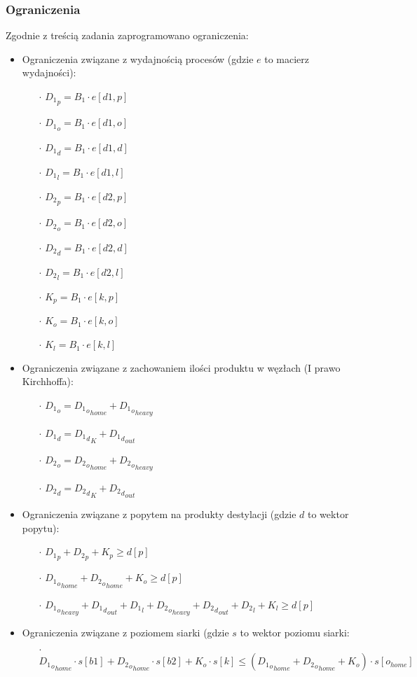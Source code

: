 \documentclass{article}
\begin{document}
\subsubsection{Ograniczenia}
Zgodnie z treścią zadania zaprogramowano ograniczenia:
\begin{itemize}
	\item Ograniczenia związane z wydajnością procesów (gdzie $e$ to macierz wydajności):
	\begin{itemize}
		\item[$\cdot$] ${D_1}_p = B_1 \cdot e[d1,p]$
		\item[$\cdot$] ${D_1}_o = B_1 \cdot e[d1,o]$
		\item[$\cdot$] ${D_1}_d = B_1 \cdot e[d1,d]$
		\item[$\cdot$] ${D_1}_l = B_1 \cdot e[d1,l]$
		\item[$\cdot$] ${D_2}_p = B_1 \cdot e[d2,p]$
		\item[$\cdot$] ${D_2}_o = B_1 \cdot e[d2,o]$
		\item[$\cdot$] ${D_2}_d = B_1 \cdot e[d2,d]$
		\item[$\cdot$] ${D_2}_l = B_1 \cdot e[d2,l]$
		\item[$\cdot$] ${K}_p = B_1 \cdot e[k,p]$
		\item[$\cdot$] ${K}_o = B_1 \cdot e[k,o]$
		\item[$\cdot$] ${K}_l = B_1 \cdot e[k,l]$
	\end{itemize}
	\item Ograniczenia związane z zachowaniem ilości produktu w węzłach (I prawo Kirchhoffa):
	\begin{itemize}
		\item[$\cdot$] ${D_1}_o = {{D_1}_o}_{home} + {{D_1}_o}_{heavy}$
		\item[$\cdot$] ${D_1}_d = {{D_1}_d}_K + {{D_1}_d}_{out}$
		\item[$\cdot$] ${D_2}_o = {{D_2}_o}_{home} + {{D_2}_o}_{heavy}$
		\item[$\cdot$] ${D_2}_d = {{D_2}_d}_K + {{D_2}_d}_{out}$
	\end{itemize}
	\item Ograniczenia związane z popytem na produkty destylacji (gdzie $d$ to wektor popytu):
	\begin{itemize}
		\item[$\cdot$] ${D_1}_p + {D_2}_p + K_p \geq d[p]$
		\item[$\cdot$] ${{D_1}_o}_{home} + {{D_2}_o}_{home} + K_o \geq d[p]$
		\item[$\cdot$] ${{D_1}_o}_{heavy} + {{D_1}_d}_{out} + {D_1}_l + {{D_2}_o}_{heavy} + {{D_2}_d}_{out} + {D_2}_l + K_l \geq d[p]$
	\end{itemize}
	\item Ograniczenia związane z poziomem siarki (gdzie $s$ to wektor poziomu siarki:
	\begin{itemize}
		\item[$\cdot$] ${{D_1}_o}_{home} \cdot s[b1] + {{D_2}_o}_{home} \cdot s[b2] + K_o \cdot s[k] \leq ({{D_1}_o}_{home} + {{D_2}_o}_{home} + K_o) \cdot s[o_{home}]$
	\end{itemize}
\end{itemize}
\end{document}
